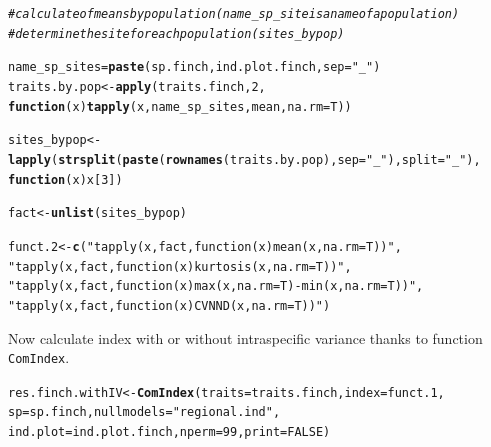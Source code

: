 \documentclass[12pt]{article}\usepackage[]{graphicx}\usepackage[]{color}
\makeatletter
\newcommand{\hlnum}[1]{\textcolor[rgb]{0.686,0.059,0.569}{#1}}%
\newcommand{\hlstr}[1]{\textcolor[rgb]{0.192,0.494,0.8}{#1}}%
\newcommand{\hlcom}[1]{\textcolor[rgb]{0.678,0.584,0.686}{\textit{#1}}}%
\newcommand{\hlstd}[1]{\textcolor[rgb]{0.345,0.345,0.345}{#1}}%
\newcommand{\hlkwa}[1]{\textcolor[rgb]{0.161,0.373,0.58}{\textbf{#1}}}%
\newcommand{\hlkwb}[1]{\textcolor[rgb]{0.69,0.353,0.396}{#1}}%
\newcommand{\hlkwc}[1]{\textcolor[rgb]{0.333,0.667,0.333}{#1}}%
\newcommand{\hlkwd}[1]{\textcolor[rgb]{0.737,0.353,0.396}{\textbf{#1}}}%
\newenvironment{kframe}{%
 \def\at@end@of@kframe{}%
 \ifinner\ifhmode%
  \def\at@end@of@kframe{\end{minipage}}%
  \begin{minipage}{\columnwidth}%
 \fi\fi%
 \def\FrameCommand##1{\hskip\@totalleftmargin \hskip-\fboxsep
 \colorbox{shadecolor}{##1}\hskip-\fboxsep
     \hskip-\linewidth \hskip-\@totalleftmargin \hskip\columnwidth}%
 \MakeFramed {\advance\hsize-\width
   \@totalleftmargin\z@ \linewidth\hsize
   \@setminipage}}%
 {\par\unskip\endMakeFramed%
 \at@end@of@kframe}
\newenvironment{knitrout}{}{} %
\makeatother
\begin{document}
\begin{knitrout}
\color{fgcolor}\begin{kframe}
\begin{alltt}
\hlcom{#calculate  of means by population (name_sp_site is a name of a population) }
\hlcom{#determine the site for each population (sites_bypop)}

\hlstd{name_sp_sites} \hlkwb{=} \hlkwd{paste}\hlstd{(sp.finch, ind.plot.finch,} \hlkwc{sep} \hlstd{=} \hlstr{"_"}\hlstd{)}
\hlstd{traits.by.pop}\hlkwb{<-}\hlkwd{apply}\hlstd{(traits.finch,} \hlnum{2} \hlstd{,}
           \hlkwa{function} \hlstd{(}\hlkwc{x}\hlstd{)} \hlkwd{tapply}\hlstd{(x, name_sp_sites, mean ,} \hlkwc{na.rm} \hlstd{= T))}

\hlstd{sites_bypop}\hlkwb{<-}\hlkwd{lapply}\hlstd{(}\hlkwd{strsplit}\hlstd{(}\hlkwd{paste}\hlstd{(}\hlkwd{rownames}\hlstd{(traits.by.pop),} \hlkwc{sep} \hlstd{=} \hlstr{"_"}\hlstd{),} \hlkwc{split} \hlstd{=} \hlstr{"_"}\hlstd{),}
          \hlkwa{function}\hlstd{(}\hlkwc{x}\hlstd{) x[}\hlnum{3}\hlstd{])}

\hlstd{fact}\hlkwb{<-}\hlkwd{unlist}\hlstd{(sites_bypop)}

\hlstd{funct.2}\hlkwb{<-}\hlkwd{c}\hlstd{(}\hlstr{"tapply(x, fact, function(x) mean(x, na.rm = T))"}\hlstd{,}
          \hlstr{"tapply(x, fact, function(x) kurtosis(x, na.rm = T))"}\hlstd{,}
          \hlstr{"tapply(x, fact, function(x) max(x, na.rm = T)-min(x, na.rm = T))"}\hlstd{,}
          \hlstr{"tapply(x, fact, function(x) CVNND(x, na.rm = T))"}\hlstd{)}
\end{alltt}
\end{kframe}
\end{knitrout}

Now calculate index with or without intraspecific variance thanks to function \texttt{ComIndex}.
\begin{knitrout}
\color{fgcolor}\begin{kframe}
\begin{alltt}
\hlstd{res.finch.withIV}\hlkwb{<-}\hlkwd{ComIndex}\hlstd{(}\hlkwc{traits} \hlstd{= traits.finch,} \hlkwc{index} \hlstd{= funct.1,}
               \hlkwc{sp} \hlstd{= sp.finch,} \hlkwc{nullmodels} \hlstd{=} \hlstr{"regional.ind"}\hlstd{,}
               \hlkwc{ind.plot} \hlstd{= ind.plot.finch,} \hlkwc{nperm} \hlstd{=} \hlnum{99}\hlstd{,} \hlkwc{print} \hlstd{=} \hlnum{FALSE}\hlstd{)}
\end{alltt}
\end{kframe}
\end{knitrout}
\end{document}
